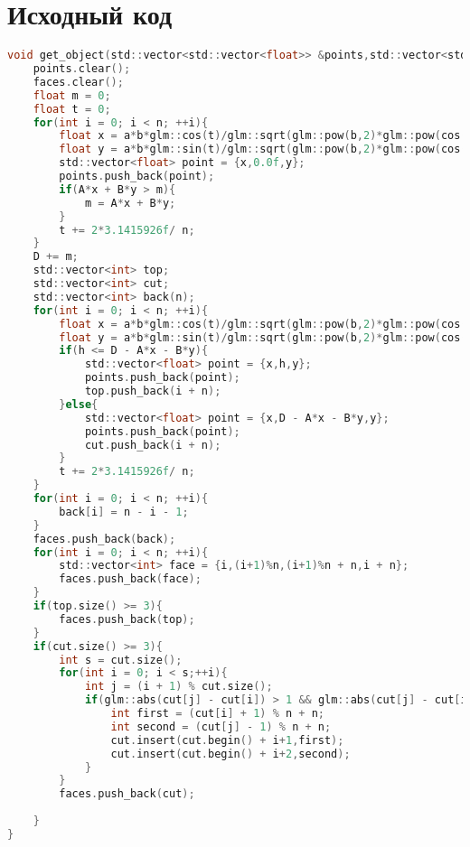 \section{Исходный код}

\begin{lstlisting}[language=C]
void get_object(std::vector<std::vector<float>> &points,std::vector<std::vector<int>> &faces,float a,float b,float h,int n, float A,float B,float D){
    points.clear();
    faces.clear();
    float m = 0;
    float t = 0;
    for(int i = 0; i < n; ++i){
        float x = a*b*glm::cos(t)/glm::sqrt(glm::pow(b,2)*glm::pow(cos(t),2) + glm::pow(a,2)*glm::pow(glm::sin(t),2));
        float y = a*b*glm::sin(t)/glm::sqrt(glm::pow(b,2)*glm::pow(cos(t),2) + glm::pow(a,2)*glm::pow(glm::sin(t),2));
        std::vector<float> point = {x,0.0f,y};
        points.push_back(point);
        if(A*x + B*y > m){
            m = A*x + B*y;
        }
        t += 2*3.1415926f/ n;
    }
    D += m;
    std::vector<int> top;
    std::vector<int> cut;
    std::vector<int> back(n);
    for(int i = 0; i < n; ++i){
        float x = a*b*glm::cos(t)/glm::sqrt(glm::pow(b,2)*glm::pow(cos(t),2) + glm::pow(a,2)*glm::pow(glm::sin(t),2));
        float y = a*b*glm::sin(t)/glm::sqrt(glm::pow(b,2)*glm::pow(cos(t),2) + glm::pow(a,2)*glm::pow(glm::sin(t),2));
        if(h <= D - A*x - B*y){
            std::vector<float> point = {x,h,y};
            points.push_back(point);
            top.push_back(i + n);
        }else{
            std::vector<float> point = {x,D - A*x - B*y,y};
            points.push_back(point);
            cut.push_back(i + n);
        }
        t += 2*3.1415926f/ n;
    }
    for(int i = 0; i < n; ++i){
        back[i] = n - i - 1;
    }
    faces.push_back(back);
    for(int i = 0; i < n; ++i){
        std::vector<int> face = {i,(i+1)%n,(i+1)%n + n,i + n};
        faces.push_back(face);
    }
    if(top.size() >= 3){
        faces.push_back(top);
    }
    if(cut.size() >= 3){
        int s = cut.size();
        for(int i = 0; i < s;++i){
            int j = (i + 1) % cut.size();
            if(glm::abs(cut[j] - cut[i]) > 1 && glm::abs(cut[j] - cut[i]) < n){
                int first = (cut[i] + 1) % n + n;
                int second = (cut[j] - 1) % n + n;
                cut.insert(cut.begin() + i+1,first);
                cut.insert(cut.begin() + i+2,second);
            }
        }
        faces.push_back(cut);
        
    }
}
\end{lstlisting}




